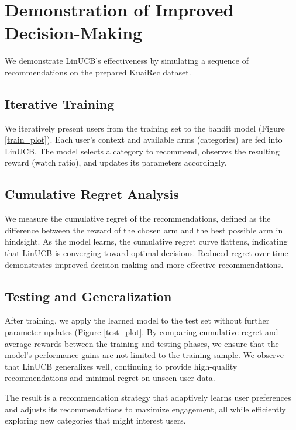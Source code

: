 \section{Demonstration of Improved Decision-Making}

We demonstrate LinUCB's effectiveness by simulating a sequence of recommendations on the prepared KuaiRec dataset.

\subsection{Iterative Training}

We iteratively present users from the training set to the bandit model (Figure \ref{train_plot}). Each user's context and available arms (categories) are fed into LinUCB. The model selects a category to recommend, observes the resulting reward (watch ratio), and updates its parameters accordingly.
    
\subsection{Cumulative Regret Analysis}

We measure the cumulative regret of the recommendations, defined as the difference between the reward of the chosen arm and the best possible arm in hindsight. As the model learns, the cumulative regret curve flattens, indicating that LinUCB is converging toward optimal decisions. Reduced regret over time demonstrates improved decision-making and more effective recommendations.

\subsection{Testing and Generalization}

After training, we apply the learned model to the test set without further parameter updates (Figure \ref{test_plot}. By comparing cumulative regret and average rewards between the training and testing phases, we ensure that the model's performance gains are not limited to the training sample. We observe that LinUCB generalizes well, continuing to provide high-quality recommendations and minimal regret on unseen user data.

The result is a recommendation strategy that adaptively learns user preferences and adjusts its recommendations to maximize engagement, all while efficiently exploring new categories that might interest users.